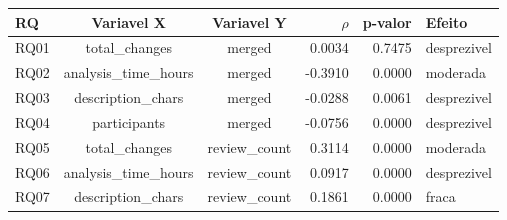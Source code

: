 \begin{tabular}{lccrrl}
\toprule
RQ & Variavel X & Variavel Y & $\rho$ & p-valor & Efeito \\
\midrule
RQ01 & total\_changes & merged & 0.0034 & 0.7475 & desprezivel \\
RQ02 & analysis\_time\_hours & merged & -0.3910 & 0.0000 & moderada \\
RQ03 & description\_chars & merged & -0.0288 & 0.0061 & desprezivel \\
RQ04 & participants & merged & -0.0756 & 0.0000 & desprezivel \\
RQ05 & total\_changes & review\_count & 0.3114 & 0.0000 & moderada \\
RQ06 & analysis\_time\_hours & review\_count & 0.0917 & 0.0000 & desprezivel \\
RQ07 & description\_chars & review\_count & 0.1861 & 0.0000 & fraca \\
\bottomrule
\end{tabular}
